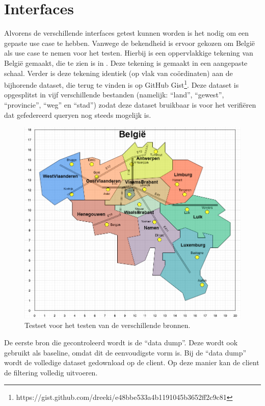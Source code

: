 \documentclass[twocolumn]{phdsymp} %
\begin{document}
\section{Interfaces}
Alvorens de verschillende interfaces getest kunnen worden is het nodig om een gepaste use case te hebben. Vanwege de bekendheid is ervoor gekozen om België als use case te nemen voor het testen. Hierbij is een oppervlakkige tekening van België gemaakt, die te zien is in . Deze tekening is gemaakt in een aangepaste schaal. Verder is deze tekening identiek (op vlak van coördinaten) aan de bijhorende dataset, die terug te vinden is op GitHub Gist\footnote{https://gist.github.com/dreeki/e48bbe533a4b1191045b3652ff2c9c81}. Deze dataset is opgesplitst in vijf verschillende bestanden (namelijk: ``land'', ``gewest'', ``provincie'', ``weg'' en ``stad'') zodat deze dataset bruikbaar is voor het verifiëren dat gefedereerd queryen nog steeds mogelijk is. 

\begin{figure}
    \centering
    \includegraphics[width=\linewidth]{images/geosparql_demo.png}
    \caption{Testset voor het testen van de verschillende bronnen.}
    \label{fig:abstr_demoset}
\end{figure}

De eerste bron die gecontroleerd wordt is de ``data dump''. Deze wordt ook gebruikt als baseline, omdat dit de eenvoudigste vorm is. Bij de ``data dump'' wordt de volledige dataset gedownload op de client. Op deze manier kan de client de filtering volledig uitvoeren. 
\end{document}
